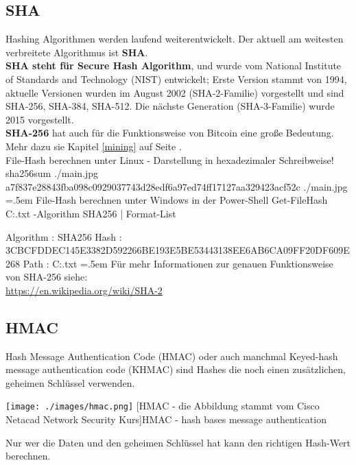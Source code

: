 \documentclass[10pt,a4paper,titlepage]{article}
\newenvironment{cverbatim}
 {\SaveVerbatim{cverb}}
 {\endSaveVerbatim
  \flushleft\fboxrule=0pt\fboxsep=.5em
  \colorbox{cverbbg}{\BUseVerbatim{cverb}}%
  \endflushleft
}
\begin{document}
\subsection{SHA}
Hashing Algorithmen werden laufend weiterentwickelt. Der aktuell am weitesten verbreitete Algorithmus ist \textbf{SHA}.\\ \textbf{SHA steht für  Secure Hash Algorithm}, und wurde vom National Institute of Standards and Technology (NIST) entwickelt; Erste Version stammt von 1994, aktuelle Versionen wurden im August 2002 (SHA-2-Familie) vorgestellt und sind SHA-256, SHA-384, SHA-512. Die nächste Generation (SHA-3-Familie) wurde 2015 vorgestellt.\vspace{.3cm}\\
\textbf{SHA-256} hat auch für die Funktionsweise von Bitcoin eine große Bedeutung. Mehr dazu sie Kapitel \ref{mining} auf Seite \pageref{mining}.
\vspace{.5cm}\\
File-Hash berechnen unter Linux - Darstellung in hexadezimaler Schreibweise!
\begin{cverbatim}
sha256sum ./main.jpg 
a7f837e28843fba098c0929037743d28edf6a97ed74ff17127aa329423acf52c  ./main.jpg
\end{cverbatim}
File-Hash berechnen unter Windows in der Power-Shell
\begin{cverbatim}
Get-FileHash C:\Users{}\Downloads\file.txt -Algorithm SHA256 | Format-List

Algorithm : SHA256
Hash      : 3CBCFDDEC145E3382D592266BE193E5BE53443138EE6AB6CA09FF20DF609E268
Path      : C:\Users{}\Downloads\file.txt
\end{cverbatim}
Für mehr Informationen zur genauen Funktionsweise von SHA-256 siehe:\\
\href{https://en.wikipedia.org/wiki/SHA-2}{\color{blue}https://en.wikipedia.org/wiki/SHA-2}

\newpage
\subsection{HMAC} \label{hmac}
Hash Message Authentication Code (HMAC) oder auch manchmal Keyed-hash message authentication code (KHMAC) sind Hashes die noch einen zusätzlichen, geheimen Schlüssel verwenden. 
\begin{center}
\texttt{[image: ./images/hmac.png]}
[HMAC - die Abbildung stammt vom Cisco Netacad Network Security Kurs]{HMAC - hash bases message authentication}
\end{center}
Nur wer die Daten und den geheimen Schlüssel hat kann den richtigen Hash-Wert berechnen.
\end{document}
